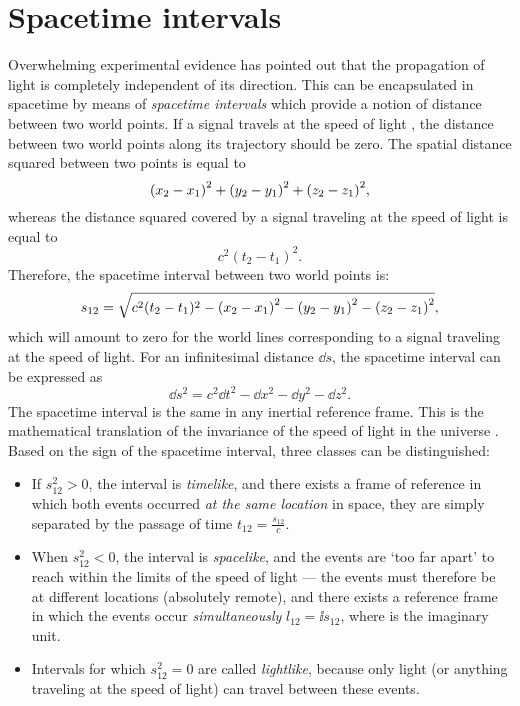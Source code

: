 \section{Spacetime intervals}
\label{sec:spacetime_intervals}
Overwhelming experimental evidence has pointed out that the propagation of light is completely independent of its direction. This can be encapsulated in spacetime by means of \emph{spacetime intervals} which provide a notion of distance between two world points. If a signal travels at the speed of light , the distance between two world points along its trajectory should be zero. The spatial distance squared between two points is equal to
\[
    \qty(x_2 - x_1)^2 + \qty(y_2 - y_1)^2 + \qty(z_2 - z_1)^2,
\]
whereas the distance squared covered by a signal traveling at the speed of light is equal to 
\[c^2(t_2 - t_1)^2. \]
Therefore, the spacetime interval  between two world points is:
\[
    s_{12} = \sqrt{c^2(t_2 - t_1)^2 - \qty(x_2 - x_1)^2 - \qty(y_2 - y_1)^2 - \qty(z_2 - z_1)^2},
\]
which will amount to zero for the world lines corresponding to a signal traveling at the speed of light. For an infinitesimal distance \(\dd{s}\), the spacetime interval can be expressed as
\[ \dd{s}^2 = c^2 \dd{t}^2 - \dd{x}^2 - \dd{y}^2 - \dd{z}^2.\]
The spacetime interval is the same in any inertial reference frame. This is the mathematical translation of the invariance of the speed of light in the universe \cite{Landau1971}. Based on the sign of the spacetime interval, three classes can be distinguished:
\begin{itemize}
    \item If \(s_{12}^2 > 0\), the interval is \emph{timelike}, and there exists a frame of reference in which both events occurred \emph{at the same location} in space, they are simply separated by the passage of time \(\displaystyle t_{12} = \frac{s_{12}}{c}\). 
    \item When \(s_{12}^2 < 0\), the interval is \emph{spacelike}, and the events are `too far apart' to reach within the limits of the speed of light --- the events must therefore be at different locations (absolutely remote), and there exists a reference frame in which the events occur \emph{simultaneously} \(l_{12} = \ii s_{12}\), where  is the imaginary unit.
    \item Intervals for which \(s_{12}^2 = 0\) are called \emph{lightlike}, because only light (or anything traveling at the speed of light) can travel between these events.
\end{itemize}
